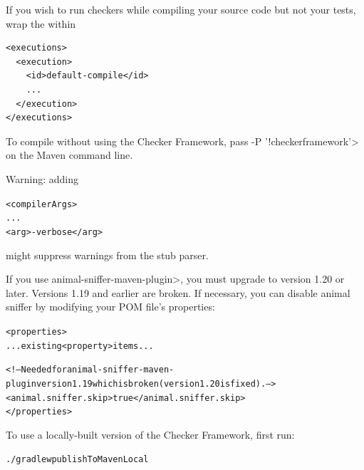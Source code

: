 \begin{enumerate}
If you wish to run checkers while compiling your source code but not your
tests, wrap the  within

\begin{Verbatim}
<executions>
  <execution>
    <id>default-compile</id>
    ...
  </execution>
</executions>
\end{Verbatim}

To compile without using the Checker Framework, pass
\<-P '!checkerframework'>
on the Maven command line.

Warning:  adding

\begin{mysmall}
\begin{alltt}
<compilerArgs>
  ...
  <arg>-verbose</arg>
\end{alltt}
\end{mysmall}

\noindent
might suppress warnings from the stub parser.

\end{enumerate}

If you use \<animal-sniffer-maven-plugin>, you must upgrade to version 1.20
or later.  Versions 1.19 and earlier are broken.  If necessary, you can
disable animal sniffer by modifying your POM file's properties:

\begin{mysmall}
\begin{alltt}
  <properties>
    ... existing <property> items ...

    <!-- Needed for animal-sniffer-maven-plugin version 1.19 which is broken (version 1.20 is fixed). -->
    <animal.sniffer.skip>true</animal.sniffer.skip>
  </properties>
\end{alltt}
\end{mysmall}



To use a locally-built version of the Checker Framework, first run:

\begin{alltt}
./gradlew publishToMavenLocal
\end{alltt}

